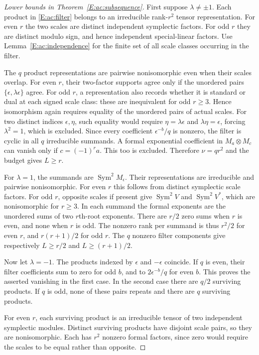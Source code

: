 \documentclass[11pt,a4paper]{article}
\theoremstyle{definition}
\theoremstyle{remark}
\numberwithin{equation}{section}
\begin{document}
\begin{proof}[Lower bounds in Theorem~\ref{E:ac:subsequence}]
First suppose $\lambda\ne\pm1$. Each product in
\eqref{E:ac:filter} belongs to an irreducible rank-$r^2$ tensor
representation. For even $r$ the two scales are distinct independent
symplectic factors. For odd $r$ they are distinct modulo sign, and
hence independent special-linear factors. Use
Lemma~\ref{E:ac:independence} for the finite set of all scale classes
occurring in the filter.

The $q$ product representations are pairwise nonisomorphic even
when their scales overlap. For even $r$, their two-factor supports
agree only if the unordered pairs
$\{\epsilon,\lambda\epsilon\}$ agree. For odd $r$, a representation
also records whether it is standard or dual at each signed scale
class: these are inequivalent for odd $r\ge3$. Hence isomorphism
again requires equality of the unordered pairs of actual scales.
For two distinct indices $\epsilon,\eta$, such equality would require
$\eta=\lambda\epsilon$ and $\lambda\eta=\epsilon$, forcing
$\lambda^2=1$, which is excluded. Since every coefficient
$\epsilon^{-b}/q$ is nonzero, the filter is cyclic in all $q$
irreducible summands. A formal exponential coefficient in
$M_a\otimes M_c$ can vanish only if $c=(-1)^r a$.
This too is excluded. Therefore $\nu=qr^2$ and the budget gives
$L\ge r$.

For $\lambda=1$, the summands are
$\operatorname{Sym}^2 M_\epsilon$. Their representations are
irreducible and pairwise nonisomorphic. For even $r$ this follows
from distinct symplectic scale factors. For odd $r$, opposite scales
if present give $\operatorname{Sym}^2 V$ and
$\operatorname{Sym}^2 V^*$, which are nonisomorphic for $r\ge3$.
In each summand the formal exponents are the unordered sums of two
$r$th-root exponents. There are $r/2$ zero sums when $r$ is even,
and none when $r$ is odd. The nonzero rank per summand is thus
$r^2/2$ for even $r$, and $r(r+1)/2$ for odd $r$.
The $q$ nonzero filter components give respectively
$L\ge r/2$ and $L\ge(r+1)/2$.

Now let $\lambda=-1$. The products indexed by $\epsilon$ and
$-\epsilon$ coincide. If $q$ is even, their filter coefficients sum
to zero for odd $b$, and to $2\epsilon^{-b}/q$ for even $b$.
This proves the asserted vanishing in the first case. In the second
case there are $q/2$ surviving products. If $q$ is odd, none of these
pairs repeats and there are $q$ surviving products.

For even $r$, each surviving product is an irreducible tensor of two
independent symplectic modules. Distinct surviving products have
disjoint scale pairs, so they are nonisomorphic. Each has $r^2$
nonzero formal factors, since zero would require the scales to be
equal rather than opposite.


\end{proof}
\end{document}
